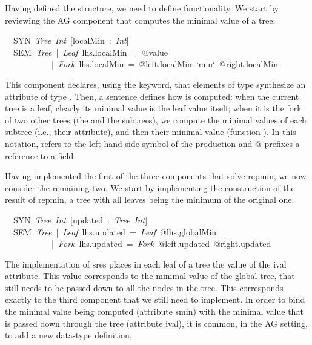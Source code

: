 \documentclass[runningheads]{llncs}
\newcommand{\texfamily}{\fontfamily{cmtex}\selectfont}
\begin{document}
  Having defined the structure, we need to define functionality. We start by
  reviewing the AG component that computes the minimal value of a tree:
\begin{hscode}\SaveRestoreHook
~~SYN~{\itshape Tree}~{\itshape Int}~[localMin~:~{\itshape Int}]
\\
\texfamily ~~SEM~{\itshape Tree}~|~{\itshape Leaf}~lhs.localMin~=~@value
\\
\texfamily ~~~~~~~~~~~|~{\itshape Fork}~lhs.localMin~=~@left.localMin~`min`~@right.localMin
\ColumnHook
\end{hscode}\resethooks
  This component declares, using the  keyword, that elements of type 
  synthesize an attribute  of type . Then, a  sentence
  defines how  is computed: when the current tree is a leaf, clearly
  its minimal value is the leaf value itself; when it is the fork of two other
  trees (the  and the  subtrees), we compute the minimal values of
  each subtree (i.e., their  attribute), and then their minimal value
  (function ). In this notation,  refers to the left-hand side symbol
  of the production and @ prefixes a reference to a field.

  Having implemented the first of the three components that solve repmin, we now
  consider the remaining two. We start by implementing the construction of the
  result of repmin, a tree with all leaves being the minimum of the original
  one.
\begin{hscode}\SaveRestoreHook
~~SYN~{\itshape Tree}~{\itshape Int}~[updated~:~{\itshape Tree}~{\itshape Int}]
\\
\texfamily ~~SEM~{\itshape Tree}~|~{\itshape Leaf}~lhs.updated~=~{\itshape Leaf}~@lhs.globalMin
\\
\texfamily ~~~~~~~~~~~|~{\itshape Fork}~lhs.updated~=~{\itshape Fork}~@left.updated~@right.updated
\ColumnHook
\end{hscode}\resethooks
  The implementation of sres places in each leaf of a tree the value of the ival
  attribute. This value corresponds to the minimal value of the global tree,
  that still needs to be passed down to all the nodes in the tree. This
  corresponds exactly to the third component that we still need to implement. In
  order to bind the minimal value being computed (attribute smin) with the
  minimal value that is passed down through the tree (attribute ival), it is
  common, in the AG setting, to add a new data-type definition,
\end{document}
